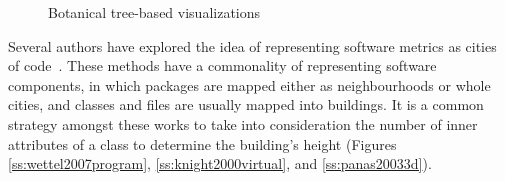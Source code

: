 \begin{figure}
    \centering
    \caption{Botanical tree-based visualizations}
\end{figure}

Several authors have explored the idea of representing software metrics as
cities of code~\cite{wettel2007program, knight2000virtual, panas20033d}. These methods have a commonality of representing
software components, in which packages are mapped either as neighbourhoods or whole
cities, and classes and files are usually mapped into buildings. It is a common
strategy amongst these works to take into consideration the number of inner attributes
of a class to determine the building's height (Figures
\ref{ss:wettel2007program}, \ref{ss:knight2000virtual}, and
\ref{ss:panas20033d}).

